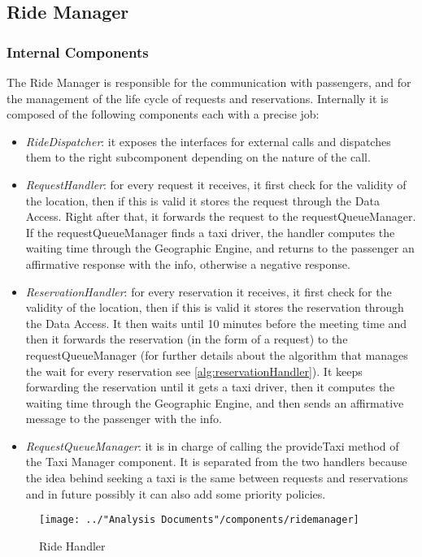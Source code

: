 \subsection{Ride Manager}\label{comp:rideManager}
\subsubsection{Internal Components}
The Ride Manager is responsible for the communication with passengers, and for the management of the life cycle of requests and reservations. Internally it is composed of the following components each with a precise job:
\begin{itemize}
	\item \textit{RideDispatcher}: it exposes the interfaces for external calls and dispatches them to the right subcomponent depending on the nature of the call.	
	\item \textit{RequestHandler}: for every request it receives, it first check for the validity of the location, then if this is valid it stores the request through the Data Access. Right after that, it forwards the request to the requestQueueManager. If the requestQueueManager finds a taxi driver, the handler computes the waiting time through the Geographic Engine, and returns to the passenger an affirmative response with the info, otherwise a negative response.
	\item \textit{ReservationHandler}: for every reservation it receives, it first check for the validity of the location, then if this is valid it stores the reservation through the Data Access. It then waits until 10 minutes before the meeting time and then it forwards the reservation (in the form of a request) to the requestQueueManager (for further details about the algorithm that manages the wait for every reservation see \ref{alg:reservationHandler}). It keeps forwarding the reservation until it gets a taxi driver, then it computes the waiting time through the Geographic Engine, and then sends an affirmative message to the passenger with the info.
	\item \textit{RequestQueueManager}: it is in charge of calling the  provideTaxi method of the Taxi Manager component. It is separated from the two handlers because the idea behind seeking a taxi is the same between requests and reservations and in future possibly it can also add some priority policies.
\end{itemize}
\begin{figure}[H]
	\centering
	\texttt{[image: ../"Analysis Documents"/components/ridemanager]}
	\label{fig:rideHandler}
	\caption{Ride Handler}
\end{figure}

